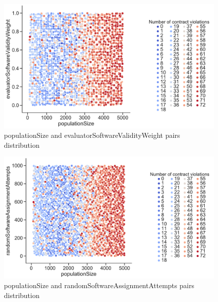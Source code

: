 \begin{figure}
	\centering
	\includegraphics[width=\textwidth]{images/PairsDistr/populationSize_evaluatorSoftwareValidityWeight.pdf}
	\caption[populationSize and evaluatorSoftwareValidityWeight pairs distribution]{populationSize and evaluatorSoftwareValidityWeight pairs distribution}
	\label{fig:populationSize_evaluatorSoftwareValidityWeight_pair}
\end{figure}
\begin{figure}
	\centering
	\includegraphics[width=\textwidth]{images/PairsDistr/populationSize_randomSoftwareAssignmentAttempts.pdf}
	\caption[populationSize and randomSoftwareAssignmentAttempts pairs distribution]{populationSize and randomSoftwareAssignmentAttempts pairs distribution}
	\label{fig:populationSize_randomSoftwareAssignmentAttempts_pair}
\end{figure}
